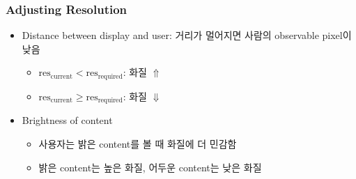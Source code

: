\subsubsection*{Adjusting Resolution}
\begin{itemize}
    \item Distance between display and user: 거리가 멀어지면 사람의 observable pixel이 낮음
    \begin{itemize}
        \item $\mathrm{res_{current}} < \mathrm{res_{required}}$: 화질 $\Uparrow$
        \item $\mathrm{res_{current}}\geq\mathrm{res_{required}}$: 화질 $\Downarrow$
    \end{itemize}
    \item Brightness of content
    \begin{itemize}
        \item 사용자는 밝은 content를 볼 때 화질에 더 민감함
        \item 밝은 content는 높은 화질, 어두운 content는 낮은 화질
    \end{itemize}
\end{itemize}
